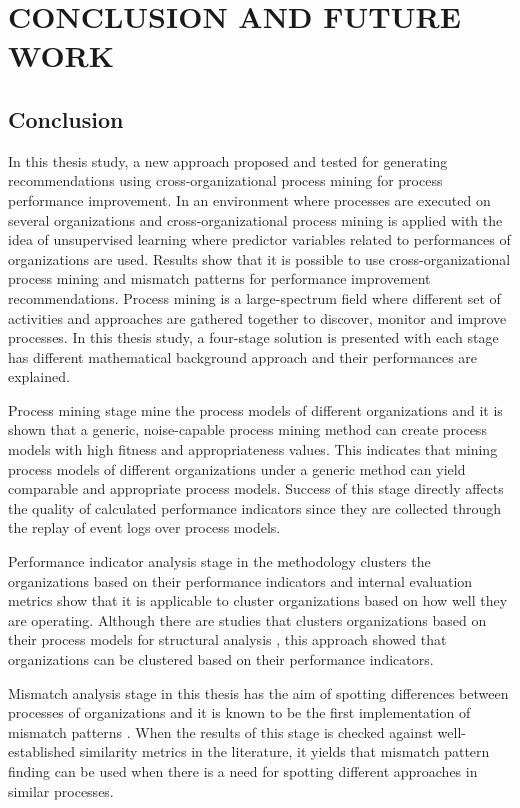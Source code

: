 \chapter{CONCLUSION AND FUTURE WORK}
\label{chp:conclusion-and-future-work}

\section{Conclusion}

In this thesis study, a new approach proposed and tested for generating recommendations using cross-organizational process mining for process performance improvement. In an environment where processes are executed on several organizations and cross-organizational process mining is applied with the idea of unsupervised learning where predictor variables related to performances of organizations are used. Results show that it is possible to use cross-organizational process mining and mismatch patterns for performance improvement recommendations. Process mining is a large-spectrum field where different set of activities and approaches are gathered together to discover, monitor and improve processes. In this thesis study, a four-stage solution is presented with each stage has different mathematical background approach and their performances are explained.

Process mining stage mine the process models of different organizations and it is shown that a generic, noise-capable process mining method can create process models with high fitness and appropriateness values. This indicates that mining process models of different organizations under a generic method can yield comparable and appropriate process models. Success of this stage directly affects the quality of calculated performance indicators since they are collected through the replay of event logs over process models.

Performance indicator analysis stage in the methodology clusters the organizations based on their performance indicators and internal evaluation metrics show that it is applicable to cluster organizations based on how well they are operating. Although there are studies that clusters organizations based on their process models for structural analysis \cite{greco2005mining}, this approach showed that organizations can be clustered based on their performance indicators.

Mismatch analysis stage in this thesis has the aim of spotting differences between processes of organizations and it is known to be the first implementation of mismatch patterns \cite{dijkman2007mismatch}. When the results of this stage is checked against well-established similarity metrics in the literature, it yields that mismatch pattern finding can be used when there is a need for spotting different approaches in similar processes. 

